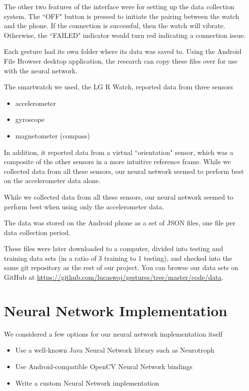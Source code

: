 \documentclass{report}
\begin{document}
The other two features of the interface were for setting up the data collection system. The ``OFF" button is pressed to initiate the pairing between the watch and the phone. If the connection is successful, then the watch will vibrate. Otherwise, the ``FAILED" indicator would turn red indicating a connection issue.

Each gesture had its own folder where its data was saved to. Using the Android File Browser desktop application, the research can copy these files over for use with the neural network.

The smartwatch we used, the LG R Watch, reported data from three sensors
\begin{itemize}
\item accelerometer
\item gyroscope
\item magnetometer (compass)
\end{itemize}
In addition, it reported data from a virtual ``orientation" sensor, which was a composite of the other sensors in a more intuitive reference frame. While we collected data from all these sensors, our neural network seemed to perform best on the accelerometer data alone.

While we collected data from all these sensors, our neural network seemed to perform best when using only the accelerometer data.

The data was stored on the Android phone as a set of JSON files, one file per data collection period. %

These files were later downloaded to a computer, divided into testing and training data sets (in a ratio of 3 training to 1 testing), and checked into the same git repository as the rest of our project. You can browse our data sets on GitHub at \url{https://github.com/lucaswoj/gestures/tree/master/code/data}.

\section{Neural Network Implementation}


We considered a few options for our neural network implementation itself
\begin{itemize}
\item Use a well-known Java Neural Network library such as Neurotroph
\item Use Android-compatible OpenCV Neural Network bindings
\item Write a custom Neural Network implementation
\end{itemize}
\end{document}

